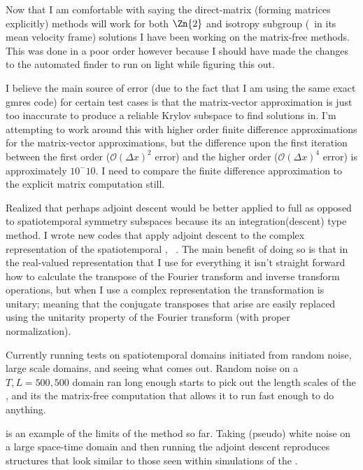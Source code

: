 Now that I am comfortable with saying the direct-matrix (forming matrices explicitly)
methods will work for both $\Zn{2}$ and  isotropy subgroup (\rpo\ in its mean velocity frame)
solutions I have been working on the matrix-free methods. This was done in a poor order
however because I should have made the changes to the automated {\twot}
finder to run on light while figuring this out.

I believe the main source of error (due to the fact that I am using the same exact gmres code)
for certain test cases is that the matrix-vector approximation is just too inaccurate to
produce a reliable Krylov subspace to find solutions in. I'm attempting to work around this with
higher order finite difference approximations for the matrix-vector approximations, but the difference
upon the first iteration between the first order ($\mathcal{O}(\Delta x)^2$ error) and the higher
order ($\mathcal{O}(\Delta x)^4$ error) is approximately $10^-10$. I need to compare the finite difference
approximation to the explicit matrix computation still.

Realized that perhaps adjoint descent would be better applied to full {\statesp} as opposed to spatiotemporal
symmetry subspaces because its an integration(descent) type method. I wrote new codes that apply adjoint
descent to the complex representation of the spatiotemporal \KSe, \ie\
. %
The main benefit of doing so is that in the real-valued representation that I
use for everything it isn't straight forward how to calculate the transpose of
the Fourier transform and inverse transform operations, but when I use a
complex representation the transformation is unitary; meaning that the
conjugate transposes that arise are easily replaced using the unitarity
property of the Fourier transform (with proper normalization).

Currently running tests on spatiotemporal domains initiated from random noise, large scale domains, and seeing
what comes out. Random noise on a $T,L = 500,500$ domain ran long enough starts to pick out the length scales of
the \KSe, and its the matrix-free computation that allows it to run fast enough to do anything.

 is an example of the limits of the method so far. Taking (pseudo) white
noise on a large space-time domain and then running the adjoint descent reproduces structures that look similar to those
seen within simulations of the \KSe.

